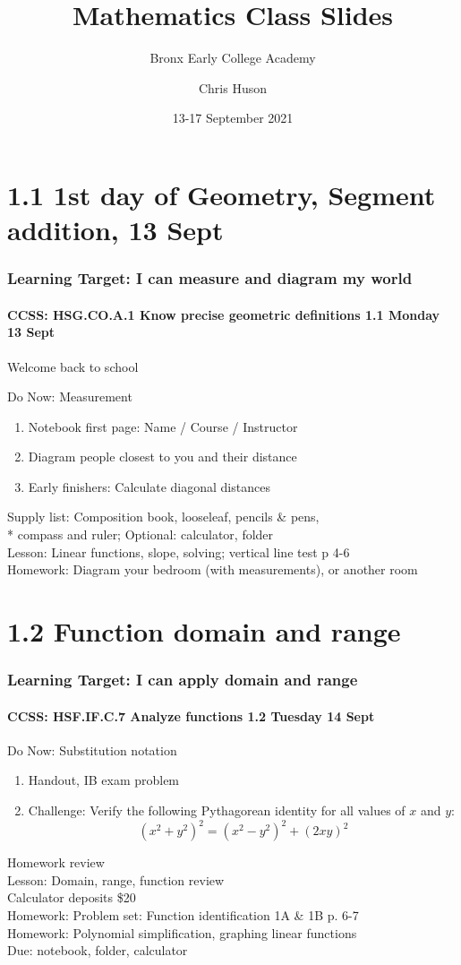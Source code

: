 \documentclass{beamer}
\title{Mathematics Class Slides}
\subtitle{Bronx Early College Academy}
\author{Chris Huson}
\date{13-17 September 2021}
\begin{document}
\frame{\titlepage}
\section[Outline]{}
\frame{\tableofcontents}


\section{1.1 1st day of Geometry, Segment addition, 13 Sept}
\frame
{
  \frametitle{Learning Target: I can measure and diagram my world}
  \framesubtitle{CCSS: HSG.CO.A.1 Know precise geometric definitions \hfill \alert{1.1 Monday 13 Sept}}

  Welcome back to school
  \begin{block}{Do Now: Measurement}
  \begin{enumerate}
      \item Notebook first page: Name / Course / Instructor
      \item Diagram people closest to you and their distance
      \item Early finishers: Calculate diagonal distances
  \end{enumerate}
  \end{block}
  Supply list: Composition book, looseleaf, pencils \& pens, \\*
  compass and ruler; Optional: calculator, folder \\[0.25cm]
  Lesson: Linear functions, slope, solving; vertical line test p 4-6 \\[0.25cm]
  Homework: Diagram your bedroom (with measurements), or another room
}


  \section{1.2 Function domain and range}
  \frame
  {
    \frametitle{Learning Target: I can apply domain and range}
    \framesubtitle{CCSS: HSF.IF.C.7 Analyze functions \hfill \alert{1.2 Tuesday 14 Sept}}

    \begin{block}{Do Now: Substitution notation}
    \begin{enumerate}
      \item Handout, IB exam problem
      \item Challenge: %
        Verify the following Pythagorean identity for all values of $x$ and $y$:
        \[(x^2+y^2)^2=(x^2-y^2)^2+(2xy)^2\]
    \end{enumerate}
    \end{block}
    Homework review\\
    Lesson: Domain, range, function review\\[5pt]
    Calculator deposits \$20
    \\[5pt]
    Homework: Problem set: Function identification 1A \& 1B p. 6-7\\
    Homework: Polynomial simplification, graphing linear functions\\
    Due: notebook, folder, calculator
  }
\end{document}
